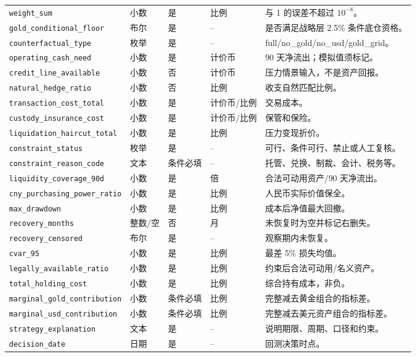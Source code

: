 \documentclass[UTF8,fontset=windows,12pt,openany]{ctexbook}
\newcommand{\Field}[1]{{\small\nolinkurl{#1}}}
\begin{document}
\begin{landscape}
\begin{longtable}{p{4.0cm}p{2.2cm}p{2.2cm}p{2.5cm}p{7.4cm}}
\Field{weight_sum} & 小数 & 是 & 比例 & 与 1 的误差不超过 \(10^{-8}\)。\\
\Field{gold_conditional_floor} & 布尔 & 是 & -- & 是否满足战略层 2.5\% 条件底仓资格。\\
\Field{counterfactual_type} & 枚举 & 是 & -- & full/no\_gold/no\_usd/gold\_grid。\\
\Field{operating_cash_need} & 小数 & 是 & 计价币 & 90 天净流出；模拟值须标记。\\
\Field{credit_line_available} & 小数 & 否 & 计价币 & 压力情景输入，不是资产回报。\\
\Field{natural_hedge_ratio} & 小数 & 否 & 比例 & 收支自然匹配比例。\\
\Field{transaction_cost_total} & 小数 & 是 & 计价币/比例 & 交易成本。\\
\Field{custody_insurance_cost} & 小数 & 是 & 计价币/比例 & 保管和保险。\\
\Field{liquidation_haircut_total} & 小数 & 是 & 比例 & 压力变现折价。\\
\Field{constraint_status} & 枚举 & 是 & -- & 可行、条件可行、禁止或人工复核。\\
\Field{constraint_reason_code} & 文本 & 条件必填 & -- & 托管、兑换、制裁、会计、税务等。\\
\Field{liquidity_coverage_90d} & 小数 & 是 & 倍 & 合法可动用资产/90 天净流出。\\
\Field{cny_purchasing_power_ratio} & 小数 & 是 & 比例 & 人民币实际价值保全。\\
\Field{max_drawdown} & 小数 & 是 & 比例 & 成本后净值最大回撤。\\
\Field{recovery_months} & 整数/空 & 否 & 月 & 未恢复时为空并标记右删失。\\
\Field{recovery_censored} & 布尔 & 是 & -- & 观察期内未恢复。\\
\Field{cvar_95} & 小数 & 是 & 比例 & 最差 5\% 损失均值。\\
\Field{legally_available_ratio} & 小数 & 是 & 比例 & 约束后合法可动用/名义资产。\\
\Field{total_holding_cost} & 小数 & 是 & 比例 & 综合持有成本，非负。\\
\Field{marginal_gold_contribution} & 小数 & 条件必填 & 比例 & 完整减去黄金组合的指标差。\\
\Field{marginal_usd_contribution} & 小数 & 条件必填 & 比例 & 完整减去美元资产组合的指标差。\\
\Field{strategy_explanation} & 文本 & 是 & -- & 说明期限、周期、口径和约束。\\
\Field{decision_date} & 日期 & 是 & -- & 回测决策时点。\\

\end{longtable}
\end{landscape}
\end{document}

